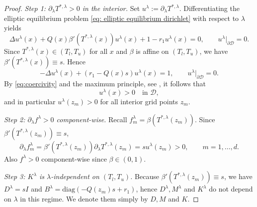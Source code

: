 \documentclass[10pt]{amsart}
\numberwithin{equation}{section}
\begin{document}
\begin{proof}
\emph{Step 1: $\partial_\lambda T^{*,\lambda}>0$ in the interior.} Set $u^\lambda:=\partial_\lambda T^{*,\lambda}$. Differentiating the elliptic equilibrium problem
\eqref{eq: elliptic equilibrium dirichlet} with respect to $\lambda$ yields
$$
\Delta u^\lambda(x) + Q(x)\beta'(T^{*,\lambda}(x)) u^\lambda(x) + 1 -r_1 u^\lambda(x)=0,
\qquad
u^\lambda|_{\partial\mathcal D}=0.
$$
Since $T^{*,\lambda}(x)\in(T_l,T_u)$ for all $x$ and $\beta$ is affine on $(T_l,T_u)$, we have
$\beta'(T^{*,\lambda}(x))\equiv s$. Hence
$$
-\Delta u^\lambda(x) + (r_1-Q(x)s) u^\lambda(x) = 1,
\qquad
u^\lambda|_{\partial\mathcal{D}}=0.
$$
By \eqref{eq:coercivity} and the maximum principle, see \cite[Section 6.4]{Evans2022}, it follows that
$$
u^\lambda(x)>0\quad \text{in } \mathcal D,
$$
and in particular $u^\lambda(z_m)>0$ for all interior grid points $z_m$.


\emph{Step 2: $\partial_\lambda f^\lambda>0$ component-wise.}
Recall $f_m^\lambda=\beta(T^{*,\lambda}(z_m))$. Since $\beta'(T^{*,\lambda}(z_m))\equiv s$,
$$
\partial_\lambda f_m^\lambda
=\beta'(T^{*,\lambda}(z_m)) \partial_\lambda T^{*,\lambda}(z_m)
= s u^\lambda(z_m) > 0,
\qquad m=1,\dots,d.
$$
Also $f^\lambda>0$ component-wise since $\beta\in(0,1)$.


\emph{Step 3: $K^\lambda$ is $\lambda$-independent on $(T_l,T_u)$.}
Because $\beta'(T^{*,\lambda}(z_m))\equiv s$, we have $D^\lambda=sI$ and
$B^\lambda=\mathrm{diag}(-Q(z_m)s+r_1)$, hence $D^\lambda, M^\lambda$ and $K^\lambda$ do not depend on $\lambda$
in this regime. We denote them simply by $D, M$ and $K$.



\end{proof}
\end{document}
